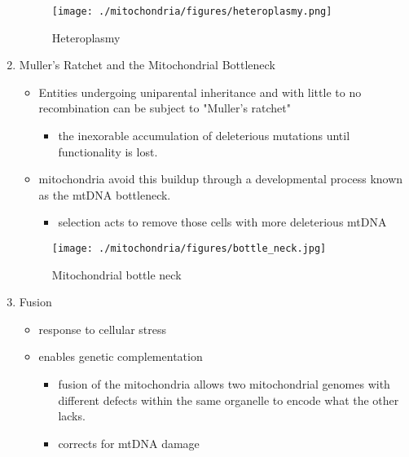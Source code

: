 \documentclass{scrartcl}
\begin{document}
\begin{enumerate}
\begin{figure}[htbp]
\centering
\texttt{[image: ./mitochondria/figures/heteroplasmy.png]}
\caption[heter]{\label{fig:org43fb8c2}
Heteroplasmy}
\end{figure}

\item Muller's Ratchet and the Mitochondrial Bottleneck
\label{sec:orgebe5b33}
\begin{itemize}
\item Entities undergoing uniparental inheritance and with little to no
recombination can be subject to "Muller's ratchet"
\begin{itemize}
\item the inexorable accumulation of deleterious mutations until
functionality is lost.
\end{itemize}

\item mitochondria avoid this buildup through a developmental process
known as the mtDNA bottleneck. 
\begin{itemize}
\item selection acts to remove those cells with more deleterious mtDNA
\end{itemize}
\end{itemize}

\begin{figure}[htbp]
\centering
\texttt{[image: ./mitochondria/figures/bottle\_neck.jpg]}
\caption[bottle]{\label{fig:org11b6f38}
Mitochondrial bottle neck}
\end{figure}

\item Fusion
\label{sec:orga7b5597}
\begin{itemize}
\item response to cellular stress
\item enables genetic complementation
\begin{itemize}
\item fusion of the mitochondria allows two mitochondrial genomes with
different defects within the same organelle to encode what the
other lacks.
\item corrects for mtDNA damage
\end{itemize}
\end{itemize}


\end{enumerate}
\end{document}
